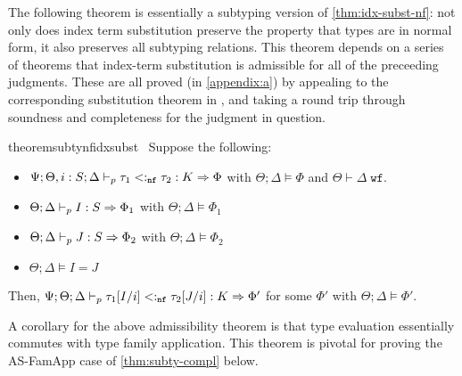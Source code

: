 The following theorem is essentially a subtyping version of \autoref{thm:idx-subst-nf}: not only does index term substitution preserve the property that types are in normal form, it also preserves all subtyping relations. This theorem depends on a series of theorems that index-term substitution is admissible for all of the preceeding judgments. These are all proved (in \autoref{appendix:a}) by appealing to the corresponding substitution theorem in \dlambdaamor, and taking a round trip through soundness and completeness for the judgment in question.

\begin{restatable}{theorem}{subtynfidxsubst}
\label{thm:subtynf-idx-subst}
~Suppose the following:
 \begin{itemize}
   \item $\Psi ; \Theta, i : S ; \Delta \vdash_p \tau_1 <:_{\texttt{nf}} \tau_2 : K \Rightarrow \Phi$ with $\Theta ; \Delta \vDash \Phi$ and $\Theta \vdash \Delta \; \texttt{wf}$.
   \item $\Theta ; \Delta \vdash_p I : S \Rightarrow \Phi_1$ with $\Theta ; \Delta \vDash \Phi_1$
   \item $\Theta ; \Delta \vdash_p J : S \Rightarrow \Phi_2$ with $\Theta ; \Delta \vDash \Phi_2$ 
   \item $\Theta ; \Delta \vDash I = J$
 \end{itemize}
 Then, $\Psi ; \Theta ; \Delta \vdash_p \tau_1[I/i] <:_{\texttt{nf}} \tau_2[J/i] : K \Rightarrow \Phi'$ for some $\Phi'$ with $\Theta ; \Delta \vDash \Phi'$.
\end{restatable}

A corollary for the above admissibility theorem is that type evaluation essentially commutes with type family application. This theorem is pivotal for proving the AS-FamApp case of \autoref{thm:subty-compl} below.


